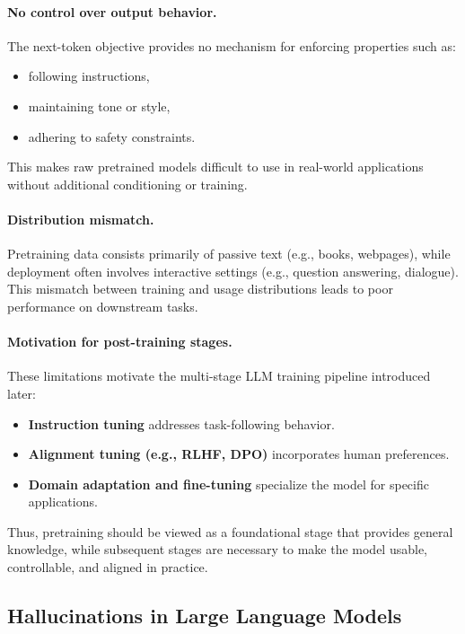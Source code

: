 \documentclass{article}
\begin{document}
\paragraph{No control over output behavior.}
The next-token objective provides no mechanism for enforcing properties such as:
\begin{itemize}
    \item following instructions,
    \item maintaining tone or style,
    \item adhering to safety constraints.
\end{itemize}
This makes raw pretrained models difficult to use in real-world applications without additional conditioning or training.

\paragraph{Distribution mismatch.}
Pretraining data consists primarily of passive text (e.g., books, webpages), while deployment often involves interactive settings (e.g., question answering, dialogue). This mismatch between training and usage distributions leads to poor performance on downstream tasks.

\paragraph{Motivation for post-training stages.}
These limitations motivate the multi-stage LLM training pipeline introduced later:
\begin{itemize}
    \item \textbf{Instruction tuning} addresses task-following behavior.
    \item \textbf{Alignment tuning (e.g., RLHF, DPO)} incorporates human preferences.
    \item \textbf{Domain adaptation and fine-tuning} specialize the model for specific applications.
\end{itemize}

Thus, pretraining should be viewed as a foundational stage that provides general knowledge, while subsequent stages are necessary to make the model usable, controllable, and aligned in practice.


\subsection{Hallucinations in Large Language Models}
\end{document}
